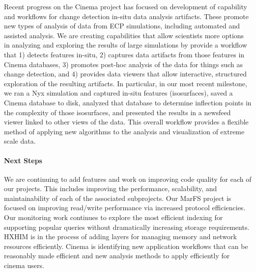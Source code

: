 Recent progress on the Cinema project has focused on development of capability
and workflows for change detection in-situ data analysis artifacts. These
promote new types of analysis of data from ECP simulations, including
automated and assisted analysis. We are creating capabilities that allow
scientists more options in analyzing and exploring the results of large
simulations by provide a workflow that 1) detects features in-situ, 2)
captures data artifacts from those features in Cinema databases, 3) promotes
post-hoc analysis of the data for things such as change detection, and 4)
provides data viewers that allow interactive, structured exploration of the
resulting artifacts. In particular, in our most recent milestone, we ran a Nyx
simulation and captured in-situ features (isosurfaces), saved a Cinema
database to disk, analyzed that database to determine inflection points in the
complexity of those isosurfaces, and presented the results in a newsfeed
viewer linked to other views of the data. This overall workflow provides a
flexible method of applying new algorithms to the analysis and visualization
of extreme scale data.

\paragraph{Next Steps}
We are continuing to add features and work on improving code quality for
each of our projects. This includes improving the performance, scalability,
and maintainability of each of the associated subprojects. Our MarFS project is
focused on improving read/write performance via increased protocol
efficiencies. Our monitoring work continues to explore the most efficient
indexing for supporting popular queries without dramatically increasing
storage requirements. HXHIM is in the process of adding layers for managing
memory and network resources efficiently. Cinema is identifying new
application workflows that can be reasonably made efficient and new analysis
methods to apply efficiently for cinema users.
